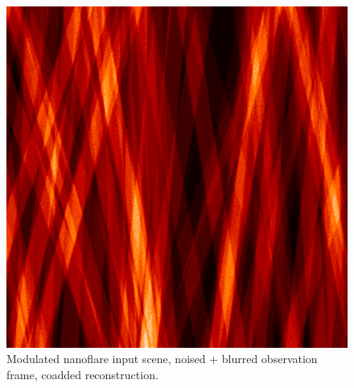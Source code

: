 \documentclass[tocnosub,noragright,centerchapter,12pt]{uiucecethesis09}
\begin{document}
\begin{figure}[h]
\begin{minipage}{.3\textwidth}
  \end{minipage}
  \begin{minipage}{.3\textwidth}
    \centering
    \includegraphics[width=1\textwidth]{figures/strands_recon.png}
  \end{minipage}
  \caption{Modulated nanoflare input scene, noised + blurred observation frame, coadded reconstruction.}
  \label{fig:recon_nanoflare}
\end{figure}
\end{document}
